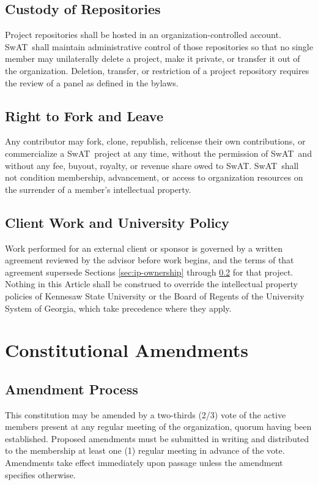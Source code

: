 \documentclass[12pt,letterpaper]{article} %
\newcommand{\orgshort}{SwAT}
\begin{document}
\subsection{Custody of Repositories}\label{sec:ip-custody}
Project repositories shall be hosted in an organization-controlled account. \orgshort\ shall
maintain administrative control of those repositories so that no single member may
unilaterally delete a project, make it private, or transfer it out of the organization.
Deletion, transfer, or restriction of a project repository requires the review of a panel as
defined in the bylaws.
\subsection{Right to Fork and Leave}\label{sec:ip-fork}
Any contributor may fork, clone, republish, relicense their own contributions, or
commercialize a \orgshort\ project at any time, without the permission of \orgshort\ and
without any fee, buyout, royalty, or revenue share owed to \orgshort. \orgshort\ shall not
condition membership, advancement, or access to organization resources on the surrender of a
member's intellectual property.
\subsection{Client Work and University Policy}\label{sec:ip-client}
Work performed for an external client or sponsor is governed by a written agreement reviewed by
the advisor before work begins, and the terms of that agreement supersede Sections
\ref{sec:ip-ownership} through \ref{sec:ip-fork} for that project. Nothing in this Article
shall be construed to override the intellectual property policies of Kennesaw State University
or the Board of Regents of the University System of Georgia, which take precedence where they
apply.

\section{Constitutional Amendments}\label{art:amendments} %
\subsection{Amendment Process}\label{sec:amendment-process}
This constitution may be amended by a two-thirds (2/3) vote of the active members
present at any regular meeting of the organization, quorum having been established.
Proposed amendments must be submitted in writing and distributed to the membership at
least one (1) regular meeting in advance of the vote. Amendments take effect immediately
upon passage unless the amendment specifies otherwise.
\end{document}
